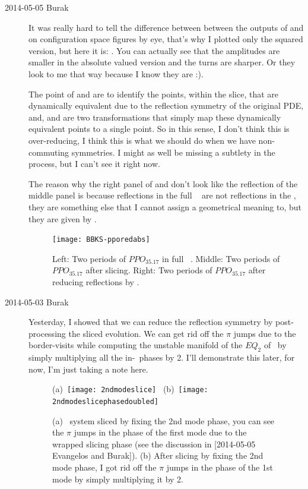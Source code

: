 \begin{description}
\item[2014-05-05 Burak] It was really hard to tell the difference between
between the outputs of  and  on configuration
space figures by eye, that's why I plotted only the squared version, but
here it is: . You can actually see that the amplitudes
are smaller in the absolute valued version and the turns are sharper. Or
they look to me that way because I know they are :).

The point of  and  are to identify
the points, within the slice, that are dynamically equivalent due to the
reflection symmetry of the original PDE, and,  and 
are two transformations that simply map these dynamically equivalent points
to a single point. So in this sense, I don't think this is over-reducing,
I think this is what we should do when we have non-commuting symmetries.
I might as well be missing a subtlety in the process, but I can't see it
right now.

The reason why the right panel of  and 
don't look like the reflection of the middle panel is because reflections
in the full \statesp\  are not reflections in the \slice ,
they are something else that I cannot assign a geometrical meaning to, but
they are given by .

\begin{figure}
\begin{center}
\texttt{[image: BBKS-pporedabs]}
\end{center}
\caption{Left: Two periods of $PPO_{35.17}$ in full \statesp\ .
Middle: Two periods of $PPO_{35.17}$ after slicing.
Right: Two periods of $PPO_{35.17}$ after reducing reflections by .}
\label{f-BBKS-pporedabs}
\end{figure}

\item[2014-05-03 Burak] Yesterday, I showed that we can reduce the reflection
symmetry by post-processing the sliced evolution. We can get rid off the
$\pi$ jumps due to the border-visits while computing the unstable manifold
of the $EQ_2$ of \KS\ by simply multiplying all the in-\slice\ phases by
2. I'll demonstrate this later, for now, I'm just taking a note here.

\begin{figure}
\begin{center}
(a)~\texttt{[image: 2ndmodeslice]}~
(b)~\texttt{[image: 2ndmodeslicephasedoubled]}
\end{center}
\caption{(a) \twoMode\ system sliced by fixing the 2nd mode phase, you
can see the $\pi$ jumps in the phase of the first mode due to the wrapped
slicing phase (see the discussion in [2014-05-05 Evangelos and Burak]).
(b) After slicing by fixing the 2nd mode phase, I got rid off the $\pi$
jumps in the phase of the 1st mode by simply multiplying it by 2. }
\label{f-2ndmodeslice}
\end{figure}


\end{description}
